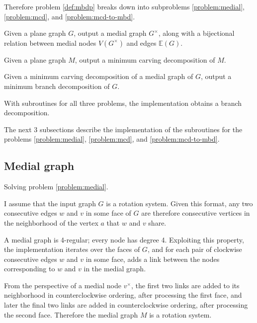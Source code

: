\documentclass{article}
\begin{document}
	Therefore problem \ref{def:mbdp} breaks down into subproblems \ref{problem:medial}, \ref{problem:mcd}, and \ref{problem:mcd-to-mbd}.

	\begin{problem}\label{problem:medial}
		Given a plane graph $G$, output a medial graph $G^\times$, along with a bijectional relation between medial nodes $V(G^\times)$ and edges $\mathbb{E}(G)$.
	\end{problem}

	\begin{problem}\label{problem:mcd}
		Given a plane graph $M$, output a minimum carving decomposition of $M$.
	\end{problem}

	\begin{problem}\label{problem:mcd-to-mbd}
		Given a minimum carving decomposition of a medial graph of $G$, output a minimum branch decomposition of $G$.
	\end{problem}

	With subroutines for all three problems, the implementation obtains a branch decomposition.


	The next 3 subsections describe the implementation of the subroutines for the problems \ref{problem:medial}, \ref{problem:mcd}, and \ref{problem:mcd-to-mbd}.

	\subsection{Medial graph}

		Solving problem \ref{problem:medial}.

		I assume that the input graph $G$ is a rotation system. Given this format, any two consecutive edges $w$ and $v$ in some face of $G$ are therefore consecutive vertices in the neighborhood of the vertex $a$ that $w$ and $v$ share.

		A medial graph is 4-regular; every node has degree 4. Exploiting this property, the implementation iterates over the faces of $G$, and for each pair of clockwise consecutive edges $w$ and $v$ in some face, adds a link between the nodes corresponding to $w$ and $v$ in the medial graph.
		
		From the perspective of a medial node $v^\times$, the first two links are added to its neighborhood in counterclockwise ordering, after processing the first face, and later the final two links are added in counterclockwise ordering, after processing the second face. Therefore the medial graph $M$ is a rotation system.
\end{document}
